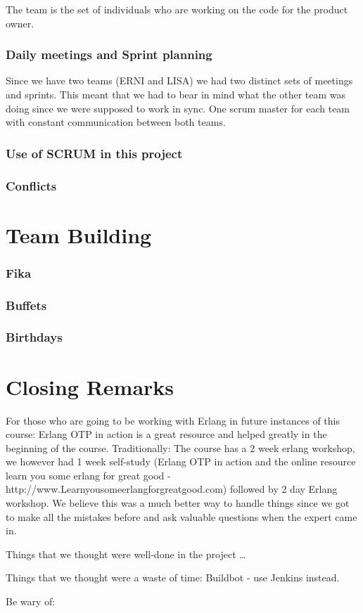 \documentclass[11pt]{report}
\begin{document}
The team is the set of individuals who are working on the code for the product owner.

\subsection{Daily meetings and Sprint planning}

Since we have two teams (ERNI and LISA) we had two distinct sets of meetings and sprints. This meant that we had to bear in mind what the other team was doing since we were supposed to work in sync. One scrum master for each team with constant communication between both teams. 

\subsection{Use of SCRUM in this project}
\subsection{Conflicts}
\chapter{Team Building}
\subsection{Fika}
\subsection{Buffets}
\subsection{Birthdays}
\chapter{Closing Remarks}

For those who are going to be working with Erlang in future instances of this course:
Erlang OTP in action is a great resource and helped greatly in the beginning of the course. 
Traditionally: The course has a 2 week erlang workshop, we however had 1 week self-study (Erlang OTP in action and  the online resource learn you some erlang for great good - http://www.Learnyousomeerlangforgreatgood.com) followed by 2 day Erlang workshop. We believe this was a much better way to handle things since we got to make all the mistakes before and ask valuable questions when the expert came in. 

Things that we thought were well-done in the project \ldots

Things that we thought were a waste of time:
Buildbot - use Jenkins instead.


Be wary of:
\end{document}
